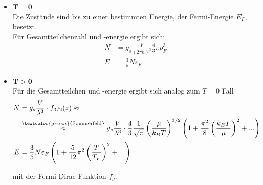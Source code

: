 \documentclass{article}
\newcommand{\lr}[1]{\left(#1\right)}
\newcommand{\commenttext}[1]{\textcolor{gruen}{\text{#1}}}
\begin{document}
	\begin{itemize}
		\item \textbf{$\mathbf{T=0}$}\\
		Die Zustände sind bis zu einer bestimmten Energie, der Fermi-Energie $E_F$, besetzt.\\
Für Gesamtteilchenzahl und -energie ergibt sich:
			\begin{align}
				N &= g_s \frac{V}{(2\pi\hbar)^3} \frac{4}{3}\pi p_F^3 \\
				E &= \frac{3}{5} N \varepsilon_F
			\end{align}
	
	
		\item \textbf{$\mathbf{T>0}$}\\
		Für die Gesamtteilchen und -energie ergibt sich analog zum $T=0$ Fall
			\begin{align}
				N &= g_s\frac{V}{\lambda^3} \cdot f_{3/2}(z) \approx \\
				&\stackrel{\commenttext{Sommerfeld}}{\approx} g_s\frac{V}{\lambda^3} \cdot \frac{4}{3}\frac{1}{\sqrt{\pi}} \lr{\frac{\mu}{k_B T}}^{3/2} \lr{ 1 + \frac{\pi^2}{8} \lr{\frac{k_B T}{\mu}}^2 + ...}\\
				E &= \frac{3}{5}N\varepsilon_F \lr{ 1 + \frac{5}{12}\pi^2 \lr{\frac{T}{T_F}}^2 + ...}
			\end{align}

		mit der Fermi-Dirac-Funktion $f_\nu$.	
	\end{itemize}


\newpage
\end{document}
